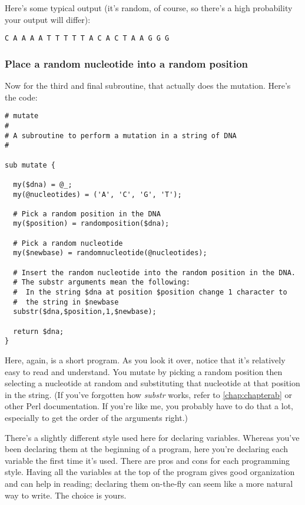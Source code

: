 Here's some typical output (it's random, of course, so there's a high probability your output will differ):

\begin{lstlisting}
C A A A A T T T T T A C A C T A A G G G 
\end{lstlisting}

\subsubsection{Place a random nucleotide into a random position}
Now for the third and final subroutine, that actually does the mutation. Here's the code: 

\begin{lstlisting}
# mutate
#
# A subroutine to perform a mutation in a string of DNA
#

sub mutate {

  my($dna) = @_;
  my(@nucleotides) = ('A', 'C', 'G', 'T');

  # Pick a random position in the DNA
  my($position) = randomposition($dna);

  # Pick a random nucleotide
  my($newbase) = randomnucleotide(@nucleotides);

  # Insert the random nucleotide into the random position in the DNA.
  # The substr arguments mean the following:
  #  In the string $dna at position $position change 1 character to
  #  the string in $newbase
  substr($dna,$position,1,$newbase);

  return $dna;
}
\end{lstlisting}

Here, again, is a short program. As you look it over, notice that it's relatively easy to read and understand. You mutate by picking a random position then selecting a nucleotide at random and substituting that nucleotide at that position in the string. (If you've forgotten how \textit{substr} works, refer to \autoref{chap:chapterab} or other Perl documentation. If you're like me, you probably have to do that a lot, especially to get the order of the arguments right.)

There's a slightly different style used here for declaring variables.  Whereas you've been declaring them at the beginning of a program, here you're declaring each variable the first time it's used. There are pros and cons for each programming style. Having all the variables at the top of the program gives good organization and can help in reading; declaring them on-the-fly can seem like a more natural way to write. The choice is yours.

